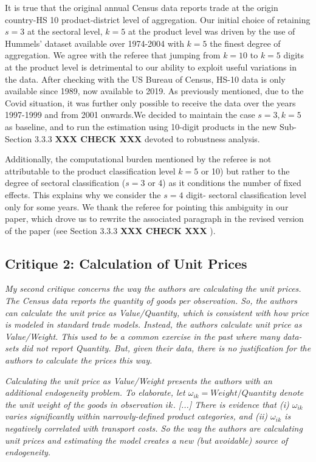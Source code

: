 \documentclass[a4paper,11pt]{article}
\begin{document}
It is true that the original annual Census data reports trade at the origin country-HS 10 product-district level of aggregation. Our initial choice of retaining $s=3$ at the sectoral level, $k=5$ at the product level was driven by the use of Hummels' dataset available over 1974-2004 with $k=5$ the finest degree of aggregation. We agree with the referee that jumping from $k=10$ to $k=5$ digits at the product level is detrimental to our ability to exploit useful variations in the data. After checking with the US Bureau of Census, HS-10 data is only available since 1989, now available to 2019. As previously mentioned, due to the Covid situation, it was further only possible to receive the data over the years 1997-1999 and from 2001 onwards.We decided to maintain the case $s=3, k=5$ as baseline, and to run the estimation using 10-digit products in the new Sub-Section 3.3.3 \textbf{XXX CHECK XXX }devoted to robustness analysis.

Additionally, the computational burden mentioned by the referee is not attributable to the product classification level $k=5$ or 10) but rather to the degree of sectoral classification ($s=3$ or 4) as it conditions the number of fixed effects. This explains why we consider the $s=4$ digit- sectoral classification level only for some years. We thank the referee for pointing this ambiguity in our paper, which drove us to rewrite the associated paragraph in the revised version of the paper (see Section 3.3.3 \textbf{XXX CHECK XXX }).


\subsection{Critique 2: Calculation of Unit Prices}

\textit{My second critique concerns the way the authors are calculating the unit prices.
The Census data reports the quantity of goods per observation. So, the authors
can calculate the unit price as Value/Quantity, which is consistent with how
price is modeled in standard trade models. Instead, the authors calculate unit
price as Value/Weight. This used to be a common exercise in the past where
many data-sets did not report Quantity. But, given their data, there is no
justification for the authors to calculate the prices this way.}

\textit{Calculating the unit price as Value/Weight presents the authors
with an additional endogeneity problem. To elaborate, let $\omega_{ik} = Weight/Quantity$
denote the unit weight of the goods in observation $ik$. [...] There is evidence that (i) $\omega_{ik}$ varies significantly within narrowly-defined product
categories, and (ii) $\omega_{ik}$ is negatively correlated with transport costs. So the
way the authors are calculating unit prices and estimating the model creates a
new (but avoidable) source of endogeneity.}
\end{document}
